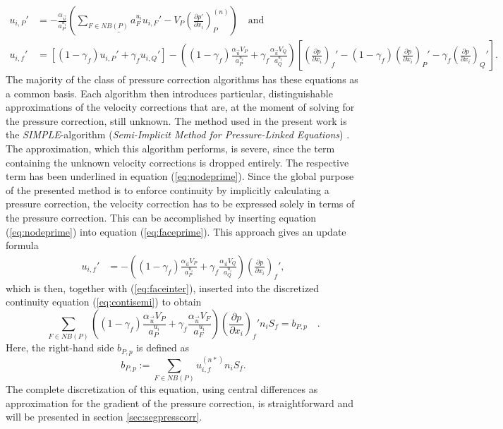 \begin{align}
  \label{eq:nodeprime}
  u_{i,P}' 
  &=  
  - \frac{\alpha_{\vec{u}}}{a_P^{u_i}} \left(\underline{\sum_{F \in NB(P)} a_F^{u_i} u_{i,F}'}
  - V_P\left(\frac{\partial p'}{\partial x_i}\right)_P^{(n)} \right) \quad \text{and}\\[1em]
  \label{eq:faceprime}
  u_{i,f}' 
  &= 
  \left[\left(1 - \gamma_f\right) u_{i,P}' + \gamma_f u_{i,Q}' \right] 
  - 
  \left(\left(1 - \gamma_f\right) \frac{\alpha_\vec{u} V_P}{a_P^{u_i}} + \gamma_f \frac{\alpha_\vec{u} V_Q}{a_Q^{u_i}}\right)
  \left[ 
  \left(\frac{\partial p}{\partial x_i}\right)_f' 
  - \left( 1 - \gamma_f \right) \left( \frac{\partial p}{\partial x_i} \right)_P' 
  - \gamma_f \left(\frac{\partial p}{\partial x_i}\right)_Q' 
  \right].
\end{align}
The majority of the class of pressure correction algorithms has these equations as a common basis. Each algorithm then introduces particular, distinguishable approximations of the velocity corrections that are, at the moment of solving for the pressure correction, still unknown. The method used in the present work is the \emph{SIMPLE}-algorithm (\emph{Semi-Implicit Method for Pressure-Linked Equations}) \cite{patankar72}. The approximation, which this algorithm performs, is severe, since the term containing the unknown velocity corrections is dropped entirely. The respective term has been underlined in equation (\ref{eq:nodeprime}). Since the global purpose of the presented method is to enforce continuity by implicitly calculating a pressure correction, the velocity correction has to be expressed solely in terms of the pressure correction. This can be accomplished by inserting equation (\ref{eq:nodeprime}) into equation (\ref{eq:faceprime}). This approach gives an update formula
\begin{align}
  \label{eq:velcorr}
  u_{i,f}' 
  &= 
  - \left(\left(1 - \gamma_f\right) \frac{\alpha_\vec{u} V_P}{a_P^{u_i}} + \gamma_f \frac{\alpha_\vec{u} V_Q}{a_Q^{u_i}}\right)
  \left(\frac{\partial p}{\partial x_i}\right)_f',
\end{align}
which is then, together with (\ref{eq:faceinter}), inserted into the discretized continuity equation (\ref{eq:contisemi}) to obtain
\begin{equation}
  \label{eq:presscorr}
  \sum_{F \in NB(P)} \left(\left(1 - \gamma_f\right) \frac{\alpha_\vec{u} V_P}{a_P^{u_i}} + \gamma_f \frac{\alpha_\vec{u} V_F}{a_F^{u_i}}\right)
  \left(\frac{\partial p}{\partial x_i}\right)_f' n_i S_f
  = b_{P,p}
  \quad.
\end{equation}
Here, the right-hand side \(b_{P,p}\) is defined as
\begin{equation}
  \label{eq:presscorrb}
  b_{P,p} := \sum_{F \in NB(P)} u_{i,f}^{(n*)} n_i S_f.
\end{equation}
The complete discretization of this equation, using central differences as approximation for the gradient of the pressure correction, is straightforward and will be presented in section \ref{sec:segpresscorr}.

